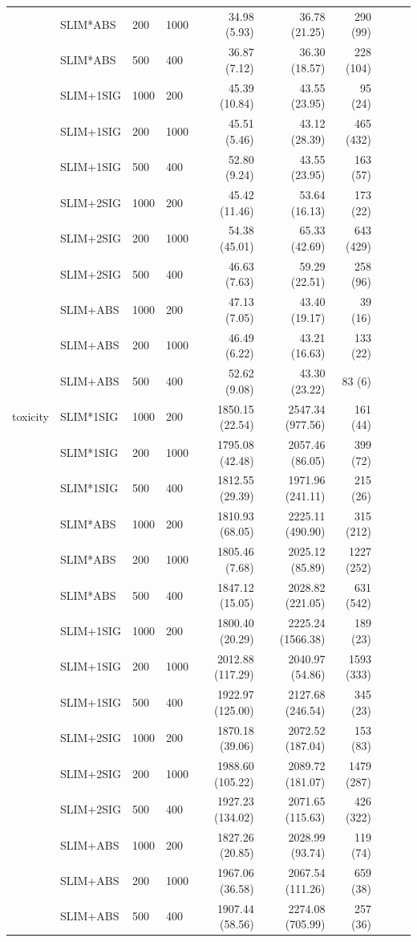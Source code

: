 \begin{longtable}{llllrrrrrr}
 & SLIM*ABS & 200 & 1000 & 34.98 (5.93) & 36.78 (21.25) & 290 (99) \\
 & SLIM*ABS & 500 & 400 & 36.87 (7.12) & 36.30 (18.57) & 228 (104) \\
 & SLIM+1SIG & 1000 & 200 & 45.39 (10.84) & 43.55 (23.95) & 95 (24) \\
 & SLIM+1SIG & 200 & 1000 & 45.51 (5.46) & 43.12 (28.39) & 465 (432) \\
 & SLIM+1SIG & 500 & 400 & 52.80 (9.24) & 43.55 (23.95) & 163 (57) \\
 & SLIM+2SIG & 1000 & 200 & 45.42 (11.46) & 53.64 (16.13) & 173 (22) \\
 & SLIM+2SIG & 200 & 1000 & 54.38 (45.01) & 65.33 (42.69) & 643 (429) \\
 & SLIM+2SIG & 500 & 400 & 46.63 (7.63) & 59.29 (22.51) & 258 (96) \\
 & SLIM+ABS & 1000 & 200 & 47.13 (7.05) & 43.40 (19.17) & 39 (16) \\
 & SLIM+ABS & 200 & 1000 & 46.49 (6.22) & 43.21 (16.63) & 133 (22) \\
 & SLIM+ABS & 500 & 400 & 52.62 (9.08) & 43.30 (23.22) & 83 (6) \\
\midrule
toxicity & SLIM*1SIG & 1000 & 200 & 1850.15 (22.54) & 2547.34 (977.56) & 161 (44) \\
 & SLIM*1SIG & 200 & 1000 & 1795.08 (42.48) & 2057.46 (86.05) & 399 (72) \\
 & SLIM*1SIG & 500 & 400 & 1812.55 (29.39) & 1971.96 (241.11) & 215 (26) \\
 & SLIM*ABS & 1000 & 200 & 1810.93 (68.05) & 2225.11 (490.90) & 315 (212) \\
 & SLIM*ABS & 200 & 1000 & 1805.46 (7.68) & 2025.12 (85.89) & 1227 (252) \\
 & SLIM*ABS & 500 & 400 & 1847.12 (15.05) & 2028.82 (221.05) & 631 (542) \\
 & SLIM+1SIG & 1000 & 200 & 1800.40 (20.29) & 2225.24 (1566.38) & 189 (23) \\
 & SLIM+1SIG & 200 & 1000 & 2012.88 (117.29) & 2040.97 (54.86) & 1593 (333) \\
 & SLIM+1SIG & 500 & 400 & 1922.97 (125.00) & 2127.68 (246.54) & 345 (23) \\
 & SLIM+2SIG & 1000 & 200 & 1870.18 (39.06) & 2072.52 (187.04) & 153 (83) \\
 & SLIM+2SIG & 200 & 1000 & 1988.60 (105.22) & 2089.72 (181.07) & 1479 (287) \\
 & SLIM+2SIG & 500 & 400 & 1927.23 (134.02) & 2071.65 (115.63) & 426 (322) \\
 & SLIM+ABS & 1000 & 200 & 1827.26 (20.85) & 2028.99 (93.74) & 119 (74) \\
 & SLIM+ABS & 200 & 1000 & 1967.06 (36.58) & 2067.54 (111.26) & 659 (38) \\
 & SLIM+ABS & 500 & 400 & 1907.44 (58.56) & 2274.08 (705.99) & 257 (36) \\
\end{longtable}